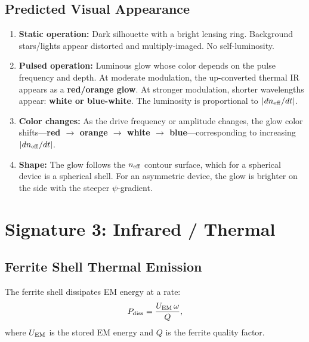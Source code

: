 \documentclass[11pt]{article}
\newcommand{\neff}{n_{\rm eff}}
\begin{document}
\subsection{Predicted Visual Appearance}

\begin{enumerate}[noitemsep]
\item \textbf{Static operation:} Dark silhouette with a bright lensing
  ring. Background stars/lights appear distorted and multiply-imaged.
  No self-luminosity.

\item \textbf{Pulsed operation:} Luminous glow whose color depends on
  the pulse frequency and depth. At moderate modulation, the up-converted
  thermal IR appears as a \textbf{red/orange glow}. At stronger
  modulation, shorter wavelengths appear: \textbf{white or blue-white}.
  The luminosity is proportional to $|d\neff/dt|$.

\item \textbf{Color changes:} As the drive frequency or amplitude
  changes, the glow color shifts---\textbf{red $\to$ orange $\to$
  white $\to$ blue}---corresponding to increasing $|d\neff/dt|$.

\item \textbf{Shape:} The glow follows the $\neff$ contour surface,
  which for a spherical device is a spherical shell. For an asymmetric
  device, the glow is brighter on the side with the steeper $\psi$-gradient.
\end{enumerate}


\section{Signature 3: Infrared / Thermal}\label{sec:thermal}

\subsection{Ferrite Shell Thermal Emission}

The ferrite shell dissipates EM energy at a rate:
\begin{equation}\label{eq:ferrite-dissipation}
P_{\rm diss} = \frac{U_{\rm EM}\,\omega}{Q},
\end{equation}
where $U_{\rm EM}$ is the stored EM energy and $Q$ is the ferrite quality
factor.
\end{document}
